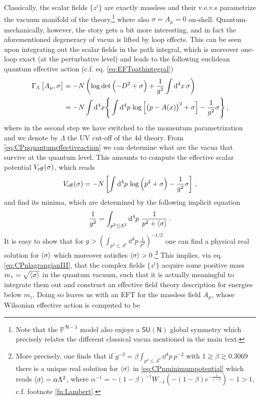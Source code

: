 Classically, the scalar fields $\{ z^i \}$ are exactly massless and their v.e.v.s parametrize the vacuum manifold of the theory,\footnote{Note that the $\mathbb{P}^{\,\mathsf{N-1}}$ model also enjoys a $\mathsf{SU(N)}$ global symmetry which precisely relates the different classical vacua mentioned in the main text.} where also $\sigma = A_{\mu} = 0$ on-shell. Quantum-mechanically, however, the story gets a bit more interesting, and in fact the aforementioned degeneracy of vacua is lifted by loop effects. This can be seen upon integrating out the scalar fields in the path integral, which is moreover one-loop exact (at the perturbative level) and leads to the following euclidean quantum effective action (c.f. eq. \eqref{eq:EFTpathintegral})
%
\begin{align}
\Gamma_{\Lambda} \left[ A_{\mu}, \sigma \right] &= - N \left( \log \det \left( - D^2 + \sigma\right) + \frac{1}{g^2} \int {\rm d}^4 x\, \sigma\right) \notag\\
&=-N \int {\rm d}^4 x \Bigg \lbrace \int {\rm d}^4p\, \log \left[ \left( p-A(x)\right)^2  + \sigma \right] -\frac{1}{g^2} \sigma \Bigg\rbrace\, ,
\label{eq:CPnquantumeffectiveaction}
\end{align}
%
where in the second step we have switched to the momentum parametrization and we denote by $\Lambda$ the UV cut-off of the 4d theory. From \eqref{eq:CPnquantumeffectiveaction} we can determine what are the vacua that survive at the quantum level. This amounts to compute the effective scalar potential $V_{\rm eff} (\sigma)$, which reads
%
\begin{align}
V_{\rm eff} (\sigma) = -N \left[ \int {\rm d}^4p\, \log \left( p^2  + \sigma \right) -\frac{1}{g^2} \sigma \right]\, ,
\label{eq:CPnpotential}
\end{align}
%
and find its minima, which are determined by the following implicit equation
%
\begin{align}
\frac{1}{g^2} = \int_{p^2 \leq \Lambda^2} {\rm d}^4p\ \frac{1}{p^2 + \braket{\sigma}}\, .
\label{eq:CPnminimumpotential}
\end{align}
%
It is easy to show that for $g > \left(\int_{p^2 \leq \Lambda^2} \dd^4p\ \frac{1}{p^2} \right)^{-1/2}$ one can find a physical real solution for $\braket{\sigma}$ which moreover satisfies $\braket{\sigma} >0$.\footnote{More precisely, one finds that if $g^{-2} = \beta \int_{p^2 \leq \Lambda^2} \dd^4p\ p^{-2}$ with $1 \gtrsim \beta \gtrsim 0.3069$ there is a unique real solution for $\braket{\sigma}$ in \eqref{eq:CPnminimumpotential} which reads $\braket{\sigma} = \alpha \Lambda^2$, where $\alpha^{-1}= -\left(1-\beta\right)^{-1} W_{-1} \left( -\left(1-\beta\right) e^{-\frac{1}{1-\beta}}\right) -1 > 1$, c.f. footnote \ref{fn:Lambert}.} This implies, via eq. \eqref{eq:CPnlagrangianIII}, that the complex fields $\{ z^i \}$ acquire some positive mass $m_z = \sqrt{\braket{\sigma}}$ in the quantum vacuum, such that it is actually meaningful to integrate them out and construct an effective field theory description for energies below $m_z$. Doing so leaves us with an EFT for the massless field $A_\mu$, whose Wilsonian effective action is computed to be 
